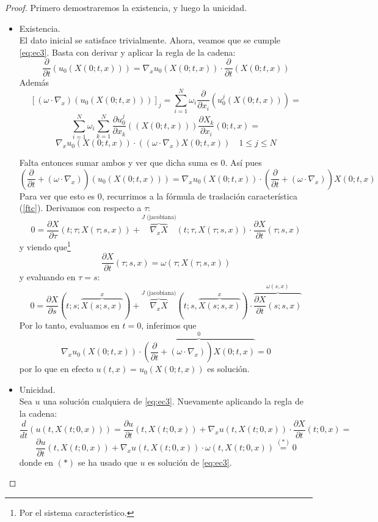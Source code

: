 \begin{proof}
    Primero demostraremos la existencia, y luego la unicidad.
    \begin{itemize}
        \item[$(i)$] Existencia. \\
        
        El dato inicial se satisface trivialmente. Ahora, veamos que se cumple \eqref{eq:ec3}. Basta con derivar y aplicar la regla de la cadena:
        $$\dfrac{\partial}{\partial t}(u_0(X(0;t,x))) = \nabla_x u_0(X(0;t,x)) \cdot \dfrac{\partial}{\partial t}(X(0;t,x))$$
        Además
        $$\left[(\omega \cdot \nabla_x)(u_0(X(0;t,x))) \right]_j = \sum_{i=1}^{N} \omega_i \dfrac{\partial}{\partial x_i} \left( u_0^j (X(0;t,x)) \right) = $$
        $$\sum_{i=1}^{N} \omega_i \sum_{k=1}^{N} \dfrac{\partial u_0^j}{\partial x_k} \left((X(0;t,x)) \right) \dfrac{\partial X_k}{\partial x_i}(0;t,x) =$$
        $$\nabla_x u_0(X(0;t,x)) \cdot ((\omega \cdot \nabla_x) X(0;t,x)) \quad 1 \leq j \leq N$$

        Falta entonces sumar ambos y ver que dicha suma es $0$. Así pues
        $$\left( \dfrac{\partial}{\partial t} + (\omega \cdot \nabla_x) \right)(u_0(X(0;t,x))) = \nabla_x u_0(X(0;t,x)) \cdot \left( \dfrac{\partial}{\partial t} + (\omega \cdot \nabla_x) \right) X(0;t,x)$$
        Para ver que esto es $0$, recurrimos a la fórmula de traslación característica (\ref{ftc}). Derivamos con respecto a $\tau$:
        $$0 = \dfrac{\partial X}{\partial \tau} (t;\tau;X(\tau;s,x)) + \overbrace{\nabla_x X}^{J \text{ (jacobiana)}} (t;\tau,X(\tau;s,x)) \cdot \dfrac{\partial X}{\partial t} (\tau; s,x)$$
        y viendo que\footnote{Por el sistema característico.} 
        $$\dfrac{\partial X}{\partial t}(\tau; s,x) = \omega(\tau; X(\tau;s,x))$$
        y evaluando en $\tau = s$:
        $$0 = \dfrac{\partial X}{\partial s} (t;s;\overbrace{X(s;s,x)}^{x}) + \overbrace{\nabla_x X}^{J \text{ (jacobiana)}} (t;s,\overbrace{X(s;s,x)}^{x}) \cdot \overbrace{\dfrac{\partial X}{\partial t} (s; s,x)}^{\omega(s,x)}$$
        Por lo tanto, evaluamos en $t=0$, inferimos que 
        $$\nabla_x u_0(X(0;t,x)) \cdot \overbrace{\left( \dfrac{\partial}{\partial t} + (\omega \cdot \nabla_x) \right) X(0;t,x)}^{0} = 0$$
        por lo que en efecto $u(t,x) = u_0(X(0;t,x))$ es solución. 

        \item[$(ii)$] Unicidad. \\
        
        Sea $u$ una solución cualquiera de \eqref{eq:ec3}. Nuevamente aplicando la regla de la cadena:
        $$\dfrac{d}{dt}(u(t,X(t;0,x))) = \dfrac{\partial u}{\partial t}(t,X(t;0,x)) + \nabla_x u (t,X(t;0,x)) \cdot \dfrac{\partial X}{\partial t}(t;0,x) = $$
        $$\dfrac{\partial u}{\partial t} (t,X(t;0,x)) + \nabla_x u(t,X(t;0,x)) \cdot \omega(t,X(t;0,x)) \stackrel{(*)}{=} 0$$
        donde en $(*)$ se ha usado que $u$ es solución de \eqref{eq:ec3}. \\


\end{itemize}
\end{proof}
